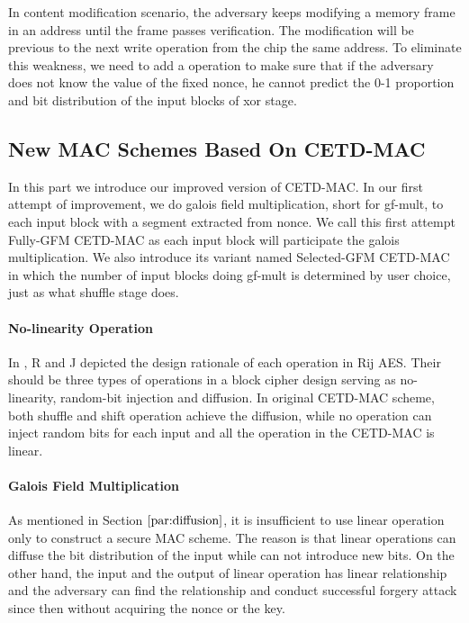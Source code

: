 In content modification scenario, the adversary keeps modifying a memory frame in an address until the frame passes verification. The modification will be previous to the next write operation from the chip the same address. 
To eliminate this weakness, we need to add a operation to make sure that if the adversary does not know the value of the fixed nonce, he cannot predict the 0-1 proportion and bit distribution of the input blocks of xor stage. 

\subsection{New MAC Schemes Based On CETD-MAC}
In this part we introduce our improved version of CETD-MAC. In our first attempt
of improvement, we do galois field multiplication, short for gf-mult, to each input block with a
segment extracted from nonce. We call this first attempt Fully-GFM CETD-MAC as
each input block will participate the galois multiplication. We also introduce
its variant named Selected-GFM CETD-MAC in which the number of input blocks
doing gf-mult is determined by user choice, just as what shuffle stage does. 

\paragraph{No-linearity Operation}
In \cite{aes1999}, R and J depicted the design rationale of each operation in Rij AES. Their should be three types of operations in a block cipher design serving as no-linearity, random-bit injection and diffusion.  
In original CETD-MAC scheme, both shuffle and shift operation achieve the diffusion, while no operation can inject random bits for each input and all the operation in the CETD-MAC is linear.  

\paragraph{Galois Field Multiplication}
As mentioned in Section $\ref{par:diffusion}$, it is insufficient to use linear operation
only to construct a secure MAC scheme. The reason is that linear operations can
diffuse the bit distribution of the input while can not introduce new bits. On
the other hand, the input and the output of linear operation has linear
relationship and the adversary can find the relationship and conduct successful
forgery attack since then without acquiring the nonce or the key.

